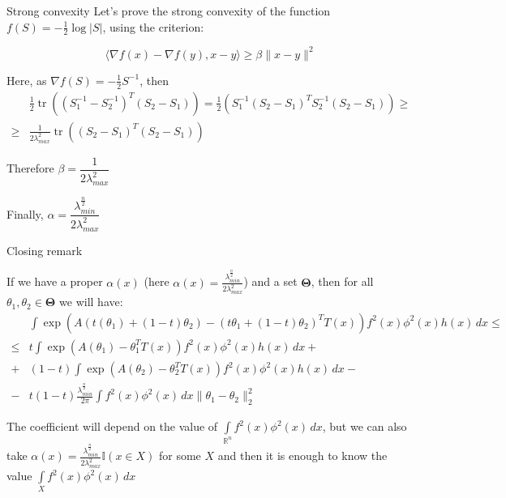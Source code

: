 \documentclass[10pt]{beamer}
\DeclareMathOperator{\tr}{tr}
\begin{document}
\begin{frame}{Strong convexity}
Let's prove the strong convexity of the function $f(S) = - \frac 12 \log |S|$, using the criterion:

\[
\langle \nabla f(x) - \nabla f(y), x-y \rangle \geq \beta \|x-y \|^2
\]

Here, as $\nabla f(S) = - \frac 12 S^{-1}$, then
\begin{align*}
&\frac12 \tr ((S_1^{-1}- S_2^{-1})^T(S_2 - S_1)) = \frac 12 (S_1^{-1}(S_2-S_1)^TS_2^{-1}(S_2 -S_1)) \geq \\
\geq & \frac1{2\lambda_{max}^2}\tr((S_2 - S_1)^T(S_2-S_1))
\end{align*}

Therefore $\beta = \dfrac{1}{2\lambda_{max}^2}$

Finally, $\alpha= \dfrac{\lambda_{min}^{\frac{n}{2}}}{2 \lambda_{max}^2}$
 

\end{frame}



\begin{frame}{Closing remark}

If we have a proper $\alpha(x)$ (here $\alpha(x) = \frac{\lambda_{min}^{\frac{n}{2}}}{2 \lambda_{max}^2}$) and a set $\mathbf{\Theta}$, then for all $\theta_1, \theta_2 \in \mathbf{\Theta}$ we will have:
\begin{align*}
&\int \exp(A(t(\theta_1) + (1-t)\theta_2) - (t\theta_1 + (1-t)\theta_2)^TT(x))f^2(x)\phi^2(x)h(x)\, d x  \leq\\
\leq &t \int \exp(A(\theta_1) - \theta_1^TT(x))f^2(x)\phi^2(x)h(x)\, d x +\\
+&(1-t) \int \exp(A(\theta_2) - \theta_2^TT(x))f^2(x)\phi^2(x)h(x)\, d x -\\
-&t(1-t) \frac{\lambda_{min}^{\frac n2}}{2\pi} \int f^2(x)\phi^2(x)\, dx \|\theta_1 - \theta_2\|^2_2
\end{align*}

The coefficient will depend on the value of $\int \limits_{\mathbb{R}^n} f^2(x)\phi^2(x)\, dx$, but we can also take $\alpha(x) = \frac{\lambda_{min}^{\frac{n}{2}}}{2 \lambda_{max}^2} \mathbb{I}(x \in X)$ for some $X$ and then it is enough to know the value $\int \limits_X f^2(x)\phi^2(x)\, dx$

\end{frame}
\end{document}
